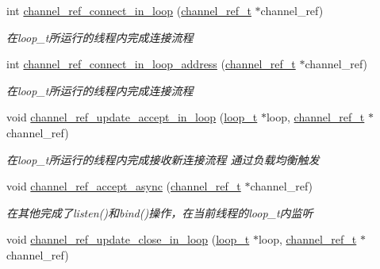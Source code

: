 \begin{DoxyCompactItemize}
int \hyperlink{a00049_af748fb7631166d41826187a22ef28cc4_af748fb7631166d41826187a22ef28cc4}{channel\+\_\+ref\+\_\+connect\+\_\+in\+\_\+loop} (\hyperlink{a00051_a151271c9d188ef28d4d24bb81dcc1263_a151271c9d188ef28d4d24bb81dcc1263}{channel\+\_\+ref\+\_\+t} $\ast$channel\+\_\+ref)
\begin{DoxyCompactList}\small\item\em 在loop\+\_\+t所运行的线程内完成连接流程 \end{DoxyCompactList}\item 
int \hyperlink{a00049_abb315a5ff9896484c78f6ca3105f98ce_abb315a5ff9896484c78f6ca3105f98ce}{channel\+\_\+ref\+\_\+connect\+\_\+in\+\_\+loop\+\_\+address} (\hyperlink{a00051_a151271c9d188ef28d4d24bb81dcc1263_a151271c9d188ef28d4d24bb81dcc1263}{channel\+\_\+ref\+\_\+t} $\ast$channel\+\_\+ref)
\begin{DoxyCompactList}\small\item\em 在loop\+\_\+t所运行的线程内完成连接流程 \end{DoxyCompactList}\item 
void \hyperlink{a00049_af2b04a39619b524c176a1b921a2a662d_af2b04a39619b524c176a1b921a2a662d}{channel\+\_\+ref\+\_\+update\+\_\+accept\+\_\+in\+\_\+loop} (\hyperlink{a00051_a9c3ad1cd2de83e09f3a7b59fa82c94ee_a9c3ad1cd2de83e09f3a7b59fa82c94ee}{loop\+\_\+t} $\ast$loop, \hyperlink{a00051_a151271c9d188ef28d4d24bb81dcc1263_a151271c9d188ef28d4d24bb81dcc1263}{channel\+\_\+ref\+\_\+t} $\ast$channel\+\_\+ref)
\begin{DoxyCompactList}\small\item\em 在loop\+\_\+t所运行的线程内完成接收新连接流程 通过负载均衡触发 \end{DoxyCompactList}\item 
void \hyperlink{a00049_a0f2b0c05186514a30fb7b638c7449935_a0f2b0c05186514a30fb7b638c7449935}{channel\+\_\+ref\+\_\+accept\+\_\+async} (\hyperlink{a00051_a151271c9d188ef28d4d24bb81dcc1263_a151271c9d188ef28d4d24bb81dcc1263}{channel\+\_\+ref\+\_\+t} $\ast$channel\+\_\+ref)
\begin{DoxyCompactList}\small\item\em 在其他完成了listen()和bind()操作，在当前线程的loop\+\_\+t内监听 \end{DoxyCompactList}\item 
void \hyperlink{a00049_acd7537431cf488ed39e782e63f79d997_acd7537431cf488ed39e782e63f79d997}{channel\+\_\+ref\+\_\+update\+\_\+close\+\_\+in\+\_\+loop} (\hyperlink{a00051_a9c3ad1cd2de83e09f3a7b59fa82c94ee_a9c3ad1cd2de83e09f3a7b59fa82c94ee}{loop\+\_\+t} $\ast$loop, \hyperlink{a00051_a151271c9d188ef28d4d24bb81dcc1263_a151271c9d188ef28d4d24bb81dcc1263}{channel\+\_\+ref\+\_\+t} $\ast$channel\+\_\+ref)

\end{DoxyCompactItemize}
